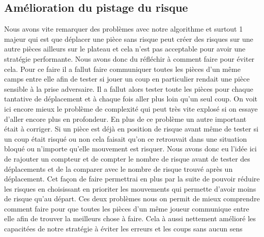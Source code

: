\documentclass[11pt]{article} %
\begin{document}
\subsection{Amélioration du pistage du risque}
Nous avons vite remarquer des problèmes avec notre algorithme et surtout 1 majeur qui est que déplacer une pièce sans risque peut créer des risques sur une autre pièces ailleurs sur le plateau et cela n'est pas acceptable pour avoir une stratégie performante. Nous avons donc du réfléchir à comment faire pour éviter cela. Pour ce faire il a fallut faire communiquer toutes les pièces d'un même camps entre elle afin de tester si jouer un coup en particulier rendait une pièce sensible à la prise adversaire. Il a fallut alors tester toute les pièces pour chaque tantative de déplacement et à chaque fois aller plus loin qu'un seul coup. On voit ici encore mieux le problème de complexité qui peut très vite explosé si on essaye d'aller encore plus en profondeur. En plus de ce problème un autre important était à corriger. Si un pièce est déjà en position de risque avant même de tester si un coup était risqué ou non cela faisait qu'on ce retrouvait dans une situation bloqué ou n'importe qu'elle mouvement est risquer. Nous avons donc eu l'idée ici de rajouter un compteur et de compter le nombre de risque avant de tester des déplacements et de la comparer avec le nombre de risque trouvé après un déplacement. Cet façon de faire permettrai en plus par la suite de pouvoir réduire les risques en choisissant en prioriter les mouvements qui permette d'avoir moins de risque qu'au départ. Ces deux problèmes nous on permit de mieux comprendre comment faire pour que toutes les pièces d'un même joueur communique entre elle afin de trouver la meilleurs chose à faire. Cela à aussi nettement amélioré les capacitées de notre stratégie à éviter les erreurs et les coups sans aucun sens
\end{document}
